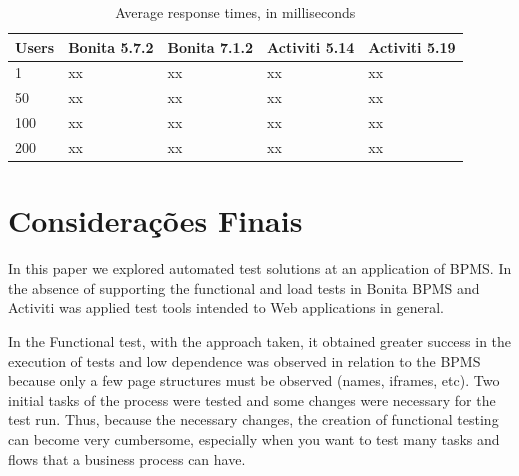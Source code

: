 \documentclass[runningheads,a4paper]{llncs}
\begin{document}
\begin{table}
\centering
\begin{tabular}{p{2cm}|p{2cm}|p{2cm}|p{2cm}|p{2cm}}
\hline
Users & Bonita 5.7.2 & Bonita 7.1.2 & Activiti 5.14 & Activiti 5.19 \\\hline
1 & xx & xx & xx & xx \\\hline
50 & xx & xx & xx & xx \\\hline
100 & xx & xx & xx & xx \\\hline
200 & xx & xx & xx & xx \\\hline
\end{tabular}
\caption{Average response times, in milliseconds}
\label{tab:resultadoCargaSelenium}
\end{table}


\section{Considerações Finais}\label{s:conclu}

In this paper we explored automated test solutions at an application of BPMS. In the absence of supporting the functional and load tests in Bonita BPMS and Activiti was applied test tools intended to Web applications in general.

In the Functional test, with the approach taken, it obtained greater success in the execution of tests and low dependence was observed in relation to the BPMS because only a few page structures must be observed (names, iframes, etc). Two initial tasks of the process  were tested and some changes were necessary for the test run. Thus, because the necessary changes, the creation of functional testing can become very cumbersome, especially when you want to test many tasks and flows that a business process can have.
\end{document}
